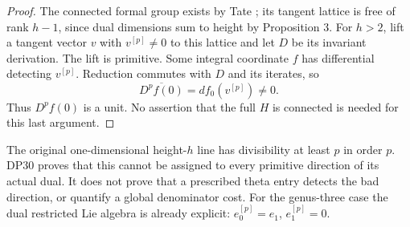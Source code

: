 \documentclass[11pt,a4paper]{article}
\theoremstyle{definition}\newtheorem{remark}[theorem]{Remark}
\begin{document}
\begin{proof}
The connected formal group exists by Tate \cite[\S2.2, Proposition 1, p.~162 and (4), p.~164]{Tate67}; its tangent lattice is free of rank $h-1$, since dual dimensions sum to height by Proposition 3. For $h>2$, lift a tangent vector $v$ with $v^{[p]}\ne0$ to this lattice and let $D$ be its invariant derivation. The lift is primitive. Some integral coordinate $f$ has differential detecting $v^{[p]}$. Reduction commutes with $D$ and its iterates, so
\[
 \overline{D^pf(0)}=df_0(v^{[p]})\ne0.
\]
Thus $D^pf(0)$ is a unit. No assertion that the full $H$ is connected is needed for this last argument.
\end{proof}

The original one-dimensional height-$h$ line has divisibility at least $p$ in order $p$. DP30 proves that this cannot be assigned to every primitive direction of its actual dual. It does not prove that a prescribed theta entry detects the bad direction, or quantify a global denominator cost. For the genus-three case the dual restricted Lie algebra is already explicit: $e_0^{[p]}=e_1$, $e_1^{[p]}=0$.
\end{document}

